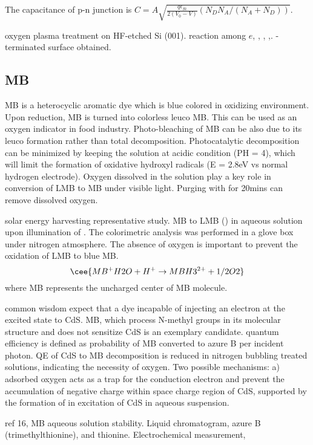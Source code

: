 The capacitance of p-n junction is $C = A \sqrt{\frac{q \epsilon_{Si}}{2(V_0 -V)}(N_D N_A/(N_A + N_D))}$.


oxygen plasma treatment on HF-etched Si (001). reaction among $e$, , , ,. -terminated surface obtained.\cite{Habib2010}

\subsection{MB}
MB is a heterocyclic aromatic dye which is blue colored in oxidizing environment. Upon reduction, MB is turned into colorless leuco MB. This can be used as an oxygen indicator in food industry. Photo-bleaching of MB can be also due to its leuco formation rather than total decomposition. Photocatalytic decomposition can be minimized by keeping the solution at acidic condition (PH = 4), which will limit the formation of oxidative hydroxyl radicals (E = 2.8eV vs normal hydrogen electrode). Oxygen dissolved in the solution play a key role in conversion of LMB to MB under visible light. Purging with  for 20mins can remove dissolved oxygen. \cite{Wang2014a}

solar energy harvesting representative study.\cite{Yoneyama1972} MB to LMB () in aqueous solution upon illumination of . The colorimetric analysis was performed in a glove box under nitrogen atmosphere. The absence of oxygen is important to prevent the oxidation of LMB to blue MB.
\[
\cee{MB^+ H2O + H^+ \rightarrow MBH3^{2+} + 1/2O2}
\]
where MB represents the uncharged center of MB molecule.

common wisdom expect that a dye incapable of injecting an electron at the excited state to CdS. MB, which process N-methyl groups in its molecular structure and does not sensitize CdS is an exemplary candidate. quantum efficiency is defined as probability of MB converted to azure B per incident photon. QE of CdS to MB decomposition is reduced in nitrogen bubbling treated solutions, indicating the necessity of oxygen. Two possible mechanisms: a) adsorbed oxygen acts as a trap for the conduction electron and prevent the accumulation of negative charge within space charge region of CdS, supported by the formation of  in excitation of CdS in aqueous suspension.\cite{Takizawa1978}

ref 16, MB aqueous solution stability. Liquid chromatogram, azure B (trimethylthionine), and thionine. Electrochemical measurement,

